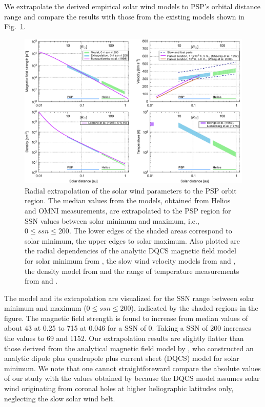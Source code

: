 \documentclass[]{aa}
\begin{document}
	We extrapolate the derived empirical solar wind models to PSP’s orbital distance range and compare the results with those from the existing models shown in Fig.~\ref{fig:sw_extrapolation_ssn_f_plot}.
	\begin{figure}
		\includegraphics[width=18cm]{figures/sw_extrapolation_ssn_f_plot.pdf}
		\caption{Radial extrapolation of the solar wind parameters to the PSP orbit region. The median values from the models, obtained from Helios and OMNI measurements, are extrapolated to the PSP region for SSN values between solar minimum and maximum, i.e., $0 \le ssn \le 200$. The lower edges of the shaded areas correspond to solar minimum, the upper edges to solar maximum. Also plotted are the radial dependencies of the analytic DQCS magnetic field model for solar minimum from \citet{Banaszkiewicz1998}, the slow wind velocity models from \citet{Sheeley1997} and \citet{Wang2000}, the density model from \citet{Leblanc1998} and the range of temperature measurements from \citet{Billings1959} and \citet{Liebenberg1975}.}
		\label{fig:sw_extrapolation_ssn_f_plot}
	\end{figure}
	The model and its extrapolation are visualized for the SSN range between solar minimum and maximum ($0 \le ssn \le 200$), indicated by the shaded regions in the figure.
	The magnetic field strength is found to increase from median values of about \SI{43}{\nT} at \SI{0.25}{\au} to \SI{715}{\nT} at \SI{0.046}{\au} for a SSN of 0. Taking a SSN of 200 increases the values to \SI{69}{\nT} and \SI{1152}{\nT}. Our extrapolation results are slightly flatter than those derived from the analytical magnetic field model by \citet{Banaszkiewicz1998}, who constructed an analytic dipole plus quadrupole plus current sheet (DQCS) model for solar minimum. We note that one cannot straightforeward compare the absolute values of our study with the values obtained by \citet{Banaszkiewicz1998} because the DQCS model assumes solar wind originating from coronal holes at higher heliographic latitudes only, neglecting the slow solar wind belt.
\end{document}
